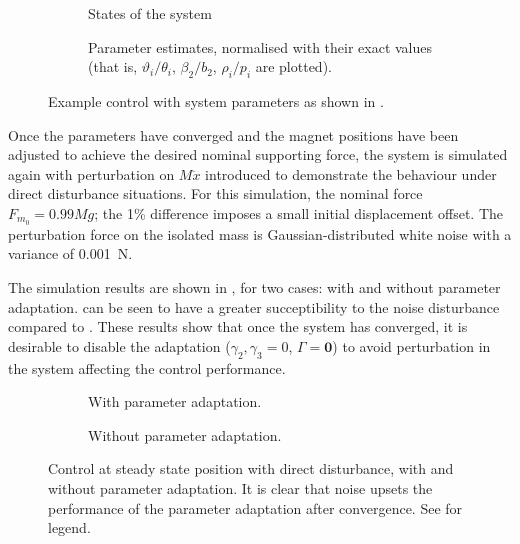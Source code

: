\begin{figure}
  \centering
  \begin{subfigure}
    \caption{States of the system}
  \end{subfigure}
  \hfill
  \begin{subfigure}
    \caption{Parameter estimates, normalised with their exact values
    (that is, $\vartheta_i/\theta_i$, $\beta_2/b_2$, $\rho_i/p_i$ are plotted).}
  \end{subfigure}
  \caption{Example control with system parameters as shown in
    .}
\end{figure}

Once the parameters have converged and the magnet positions have been
adjusted to achieve the desired nominal supporting force, the system
is simulated again with perturbation on $M\ddot x$ introduced to
demonstrate the behaviour under direct disturbance situations. For
this simulation, the nominal force $F_{m_0}=0.99Mg$; the 1\%
difference imposes a small initial displacement offset. The
perturbation force on the isolated mass is Gaussian-distributed white
noise with a variance of \SI{0.001}{N}.

The simulation results are shown in , for two cases:
with and without parameter adaptation.  can be
seen to have a greater succeptibility to the noise disturbance
compared to . These results show that once the system has
converged, it is desirable to disable the adaptation
($\gamma_2,\gamma_3=0$, $\Gamma=\bm{0}$) to avoid perturbation in the
system affecting the control performance.

\begin{figure}
  \centering
  \begin{subfigure}
    \caption{With parameter adaptation.}
  \end{subfigure}
  \hfill
  \begin{subfigure}
    \caption{Without parameter adaptation.}
  \end{subfigure}
  \caption{Control at steady state position with direct disturbance,
    with and without parameter adaptation. It is clear that noise
    upsets the performance of the parameter adaptation after convergence.
    See  for legend.}
\end{figure}

